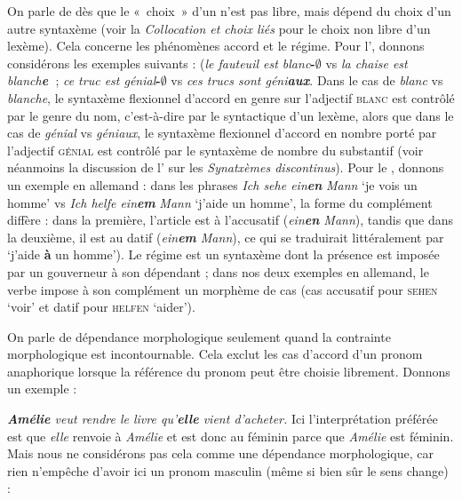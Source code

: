 {    On parle de  dès que le «~choix~» d’un  n’est pas libre, mais dépend du choix d’un autre syntaxème (voir la  \textit{Collocation et choix liés} pour le choix non libre d’un lexème). Cela concerne les phénomènes accord et le régime. Pour l', donnons considérons les exemples suivants : (\textit{le fauteuil est blanc}\textbf{{}-}\textrm{\textbf{${\emptyset}$}} vs \textit{la chaise est blanch}\textbf{\textit{e~}}; \textit{ce truc est génial}\textbf{{}-}\textrm{\textbf{${\emptyset}$}} vs \textit{ces trucs sont géni}\textbf{\textit{aux}}. Dans le cas de \textit{blanc} vs \textit{blanche}, le syntaxème flexionnel d’accord en genre sur l’adjectif \textsc{blanc} est contrôlé par le genre du nom, c’est-à-dire par le syntactique d’un lexème, alors que dans le cas de \textit{génial} vs \textit{géniaux}, le syntaxème flexionnel d’accord en nombre porté par l’adjectif \textsc{génial} est contrôlé par le syntaxème de nombre du substantif (voir néanmoins la discussion de l' sur les \textit{Synatxèmes discontinus}). Pour le , donnons un exemple en allemand : dans les phrases \textit{Ich sehe ein}\textbf{\textit{en}} \textit{Mann} ‘je vois un homme’ vs \textit{Ich helfe ein}\textbf{\textit{em}} \textit{Mann} ‘j’aide un homme’, la forme du complément diffère : dans la première, l'article est à l'accusatif (\textit{ein\textbf{en} Mann}), tandis que dans la deuxième, il est au datif (\textit{ein\textbf{em} Mann}), ce qui se traduirait littéralement par ‘j’aide \textbf{à} un homme’). Le régime est un syntaxème dont la présence est imposée par un gouverneur à son dépendant ; dans nos deux exemples en allemand, le verbe impose à son complément un morphème de cas (cas accusatif pour \textsc{sehen} ‘voir’ et datif pour \textsc{helfen} ‘aider’).

    On parle de dépendance morphologique seulement quand la contrainte morphologique est incontournable. Cela exclut les cas d’accord d’un pronom anaphorique lorsque la référence du pronom peut être choisie librement. Donnons un exemple :
    
    \ea
        \textit{\textbf{{Amélie}}  {veut rendre le livre qu’}\textbf{{elle}}  {vient d’acheter.}}
    \z
    Ici l’interprétation préférée est que \textit{elle} renvoie à \textit{Amélie} et est donc au féminin parce que \textit{Amélie} est féminin. Mais nous ne considérons pas cela comme une dépendance morphologique, car rien n’empêche d’avoir ici un pronom masculin (même si bien sûr le sens change) :
    
}
